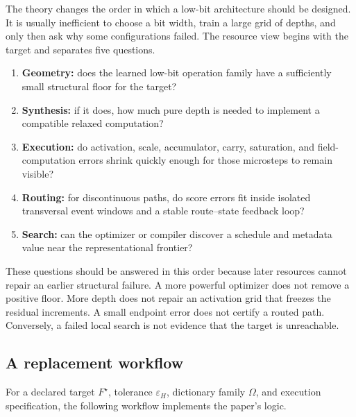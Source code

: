 \documentclass[twoside,11pt]{article}
\begin{document}
The theory changes the order in which a low-bit architecture should be designed.  It is usually inefficient to choose a bit width, train a large grid of depths, and only then ask why some configurations failed.  The resource view begins with the target and separates five questions.

\begin{enumerate}[leftmargin=1.8em,itemsep=.38em]
\item \textbf{Geometry:} does the learned low-bit operation family have a sufficiently small structural floor for the target?
\item \textbf{Synthesis:} if it does, how much pure depth is needed to implement a compatible relaxed computation?
\item \textbf{Execution:} do activation, scale, accumulator, carry, saturation, and field-computation errors shrink quickly enough for those microsteps to remain visible?
\item \textbf{Routing:} for discontinuous paths, do score errors fit inside isolated transversal event windows and a stable route--state feedback loop?
\item \textbf{Search:} can the optimizer or compiler discover a schedule and metadata value near the representational frontier?
\end{enumerate}

These questions should be answered in this order because later resources cannot repair an earlier structural failure.  A more powerful optimizer does not remove a positive floor.  More depth does not repair an activation grid that freezes the residual increments.  A small endpoint error does not certify a routed path.  Conversely, a failed local search is not evidence that the target is unreachable.

\subsection{A replacement workflow}
\label{sec:replacement-workflow-main}

For a declared target $F^\star$, tolerance $\varepsilon_H$, dictionary family $\Omega$, and execution specification, the following workflow implements the paper's logic.
\end{document}
